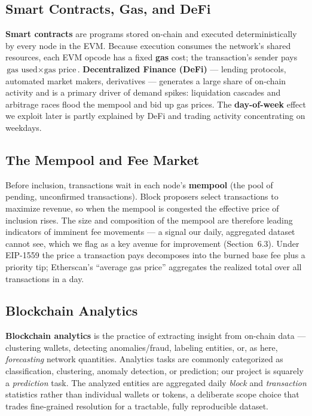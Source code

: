 \documentclass[11pt,a4paper]{article}
\begin{document}
\subsection{Smart Contracts, Gas, and DeFi}
\textbf{Smart contracts} are programs stored on-chain and executed deterministically by every
node in the EVM. Because execution consumes the network's shared resources, each EVM opcode has
a fixed \textbf{gas} cost; the transaction's sender pays $\text{gas used}\times\text{gas price}$.
\textbf{Decentralized Finance (DeFi)} --- lending protocols, automated market makers, derivatives
--- generates a large share of on-chain activity and is a primary driver of demand spikes:
liquidation cascades and arbitrage races flood the mempool and bid up gas prices. The
\textbf{day-of-week} effect we exploit later is partly explained by DeFi and trading activity
concentrating on weekdays.

\subsection{The Mempool and Fee Market}
Before inclusion, transactions wait in each node's \textbf{mempool} (the pool of pending,
unconfirmed transactions). Block proposers select transactions to maximize revenue, so when the
mempool is congested the effective price of inclusion rises. The size and composition of the
mempool are therefore leading indicators of imminent fee movements --- a signal our daily,
aggregated dataset cannot see, which we flag as a key avenue for improvement (Section~6.3). Under
EIP-1559 the price a transaction pays decomposes into the burned base fee plus a priority tip;
Etherscan's ``average gas price'' aggregates the realized total over all transactions in a day.

\subsection{Blockchain Analytics}
\textbf{Blockchain analytics} is the practice of extracting insight from on-chain data ---
clustering wallets, detecting anomalies/fraud, labeling entities, or, as here, \emph{forecasting}
network quantities. Analytics tasks are commonly categorized as classification, clustering,
anomaly detection, or prediction; our project is squarely a \emph{prediction} task. The analyzed
entities are aggregated daily \emph{block} and \emph{transaction} statistics rather than
individual wallets or tokens, a deliberate scope choice that trades fine-grained resolution for a
tractable, fully reproducible dataset.
\end{document}
